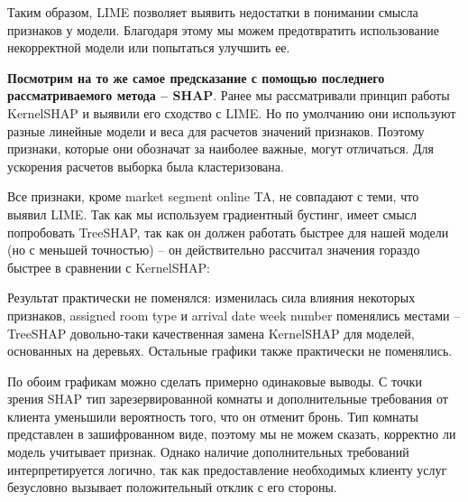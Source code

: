 Таким образом, LIME позволяет выявить недостатки в понимании смысла признаков у модели. Благодаря этому мы можем предотвратить использование некорректной модели или попытаться улучшить ее.

\textbf{Посмотрим на то же самое предсказание с помощью последнего рассматриваемого метода -- SHAP}. Ранее мы рассматривали принцип работы KernelSHAP и выявили его сходство с LIME. Но по умолчанию они используют разные линейные модели и веса для расчетов значений признаков. Поэтому признаки, которые они обозначат за наиболее важные, могут отличаться. Для ускорения расчетов выборка была кластеризована.

\begin{figure}[h]
\end{figure}
\vspace{-2mm}

Все признаки, кроме market segment online TA, не совпадают с теми, что выявил LIME. Так как мы используем градиентный бустинг, имеет смысл попробовать TreeSHAP, так как он должен работать быстрее для нашей модели (но с меньшей точностью) -- он действительно рассчитал значения гораздо быстрее в сравнении с KernelSHAP:

\begin{figure}[h]
\end{figure}
\vspace{-4mm}

Результат практически не поменялся: изменилась сила влияния некоторых признаков, assigned room type и arrival date week number поменялись местами -- TreeSHAP довольно-таки качественная замена KernelSHAP для моделей, основанных на деревьях. Остальные графики также практически не поменялись.

По обоим графикам можно сделать примерно одинаковые выводы. С точки зрения SHAP тип зарезервированной комнаты и дополнительные требования от клиента уменьшили вероятность того, что он отменит бронь. Тип комнаты представлен в зашифрованном виде, поэтому мы не можем сказать, корректно ли модель учитывает признак. Однако наличие дополнительных требований интерпретируется логично, так как предоставление необходимых клиенту услуг безусловно вызывает положительный отклик с его стороны.

